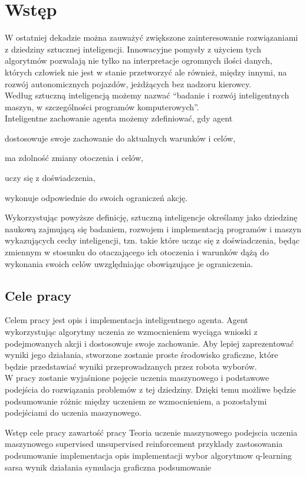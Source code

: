 \chapter{Wstęp}
\label{cha:wstep}

W ostatniej dekadzie można zauważyć zwiększone zainteresowanie rozwiązaniami z dziedziny
sztucznej inteligencji. Innowacyjne pomysły z użyciem tych algorytmów pozwalają nie tylko na interpretacje ogromnych 
ilości danych, których człowiek nie jest w stanie przetworzyć ale również, między innymi, na rozwój 
autonomicznych pojazdów, jeżdżących bez nadzoru kierowcy.\\
Według \cite{mccarthy2007artificial} sztuczną inteligencją możemy nazwać ``badanie i rozwój inteligentnych maszyn, 
w szczególności programów komputerowych''.\\
Inteligentne zachowanie agenta możemy zdefiniować, gdy agent\cite{L.:2010:AIF:1809744}
\begin{itemize*}
 \item dostosowuje swoje zachowanie do aktualnych warunków i celów,
 \item ma zdolność zmiany otoczenia i celów,
 \item uczy się z doświadczenia,
 \item wykonuje odpowiednie do swoich ograniczeń akcję.
\end{itemize*}
Wykorzystując powyższe definicję, sztuczną inteligencje określamy jako dziedzinę naukową zajmującą się badaniem, 
rozwojem i implementacją programów i maszyn wykazujących cechy inteligencji, tzn. takie które ucząc się z 
doświadczenia, będąc zmiennym w stosunku do otaczającego ich otoczenia i warunków dążą do wykonania swoich celów 
uwzględniając obowiązujące je ograniczenia. 

\section{Cele pracy}
\label{sec:celePracy}

Celem pracy jest opis i implementacja inteligentnego agenta. Agent wykorzystując algorytmy uczenia ze wzmocnieniem 
wyciąga wnioski z podejmowanych akcji i dostosowuje swoje zachowanie. Aby lepiej zaprezentować wyniki jego działania,
stworzone zostanie proste środowisko graficzne, które będzie przedstawiać wyniki przeprowadzanych przez robota wyborów.
\\
W pracy zostanie wyjaśnione pojęcie uczenia maszynowego i podstawowe podejścia do rozwiązania problemów z tej dziedziny.
Dzięki temu możliwe będzie podsumowanie różnic między uczeniem ze wzmocnieniem, a pozostałymi podejściami do uczenia 
maszynowego.



Wstęp
  cele pracy
  zawartość pracy
Teoria	
  uczenie maszynowego
  podejscia uczenia maszynowego
    supervised
    unsupervised
    reinforcement
  przyklady zastosowania
  podsumowanie
implementacja
  opis implementacji
  wybor algorytmow
    q-learning
    sarsa
  wynik działania
  symulacja graficzna
podsumowanie





